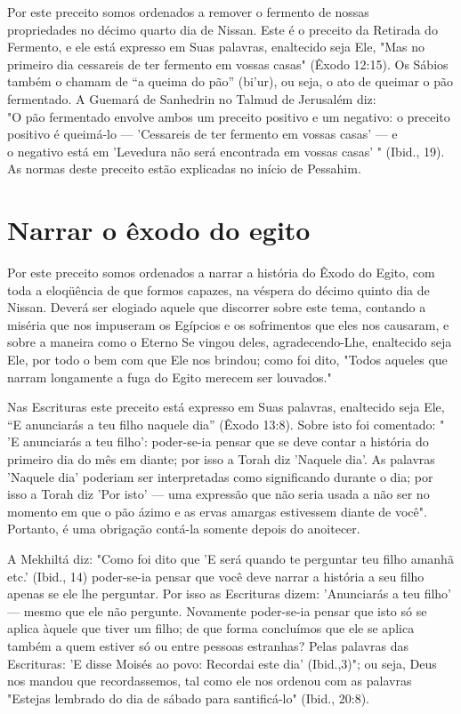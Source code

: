 Por este preceito somos ordenados a remover o fermento de nossas\\
propriedades no décimo quarto dia de Nissan. Este é o preceito da
Retirada do\\
Fermento, e ele está expresso em Suas palavras, enaltecido seja Ele,
"Mas no\\
primeiro dia cessareis de ter fermento em vossas casas" (Êxodo 12:15).
Os Sábios
também o chamam de ``a queima do pão'' (bi'ur), ou seja, o ato de
queimar
o pão fermentado. A Guemará de Sanhedrin no Talmud de Jerusalém
diz:\\
"O pão fermentado envolve ambos um preceito positivo e um negativo: o
preceito
positivo é queimá-lo --- 'Cessareis de ter fermento em vossas
casas' --- e\\
o negativo está em 'Levedura não será encontrada em vossas casas' "
(Ibid., 19).\\
As normas deste preceito estão explicadas no início de Pessahim.


\section{Narrar o êxodo do egito}

Por este preceito somos ordenados a narrar a história do Êxodo do Egito,
com toda a eloqüência de que formos capazes, na véspera do décimo quinto
dia de Nissan. Deverá ser elogiado aquele que discorrer sobre este tema,
contan­do a miséria que nos impuseram os Egípcios e os sofrimentos que
eles nos cau­saram, e sobre a maneira como o Eterno Se vingou deles,
agradecendo-Lhe, enal­tecido seja Ele, por todo o bem com que Ele nos
brindou; como foi dito, "To­dos aqueles que narram longamente a fuga do
Egito merecem ser louvados."

Nas Escrituras este preceito está expresso em Suas palavras, enalteci­do
seja Ele, ``E anunciarás a teu filho naquele dia'' (Êxodo 13:8). Sobre
isto foi comentado: " 'E anunciarás a teu filho': poder-se-ia pensar que
se deve contar a história do primeiro dia do mês em diante; por isso a
Torah diz 'Naquele dia'. As palavras 'Naquele dia' poderiam ser
interpretadas como significando duran­te o dia; por isso a Torah diz
'Por isto' --- uma expressão que não seria usada a não ser no momento em
que o pão ázimo e as ervas amargas estivessem dian­te de você".
Portanto, é uma obrigação contá-la somente depois do anoitecer.

A Mekhiltá diz: "Como foi dito que 'E será quando te perguntar teu filho
amanhã etc.' (Ibid., 14) poder-se-ia pensar que você deve narrar a
história a seu filho apenas se ele lhe perguntar. Por isso as Escrituras
dizem: 'Anunciarás a teu filho' --- mesmo que ele não pergunte.
Novamente poder-se-ia pensar que isto só se aplica àquele que tiver um
filho; de que forma concluímos que ele se aplica também a quem estiver
só ou entre pessoas estranhas? Pelas palavras das Escrituras: 'E disse
Moisés ao povo: Recordai este dia' (Ibid.,3)"; ou seja, Deus nos mandou
que recordassemos, tal como ele nos ordenou com as pala­vras "Estejas
lembrado do dia de sábado para santificá-lo" (Ibid., 20:8).

